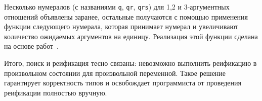 \begin{comment}

The types of \mbox{$a_1\dots a_n$} are inferred from the types of \mbox{$l_1\dots l_n$} and
have the form

\begin{lstlisting}
   $(\alpha,\;\beta)$ reified stream
\end{lstlisting}

\noindent where the type \lstinline|reified|, in turn, is

\begin{lstlisting}
   type ($\alpha$, $\beta$) reified = $<\;$prj : $\alpha$; reify : (helper -> $\{\alpha,\;\beta\}$ -> $\beta$) -> $\beta>$
\end{lstlisting}

Two methods of this type can be used to perform two different styles of reification: first, a value without
free variables can be returned as is (using the method \lstinline|prj| which checks that in the value of
interest no free variables occur, and raises an exception otherwise). If the value contains some free
variables, it has to be properly injected into the logic domain~--- this is what \lstinline|reify| stands
for. It takes as an argument a type-specific tagging function, constructed using generic
primitives described in the previous section.

In other words a user-defined handler takes streams of reified answers for all variables supplied to the top-level
goal. All streams $a_i$ contain coherent elements, so they all have the same length and $n$-th elements of all
streams correspond to the $n$-th answer, produced by the goal $G$.
\end{comment}


Несколько нумералов (с названиями \lstinline|q|, \lstinline|qr|, \lstinline|qrs|) для 1,2 и 3-аргументных отношений объявлены заранее,
остальные получаются с помощью применения функции следующего нумерала, которая принимает нумерал и увеличивают количество ожидаемых аргументов на единицу.
Реализация этой функции сделана на основе работ~\cite{Unparsing, DoWeNeed}.


Итого, поиск и реификация тесно связаны: невозможно выполнить реификацию в произвольном состоянии для произвольной переменной.
Такое решение гарантирует корректность типов и освобождает программиста от проведения реификации полностью вручную.

